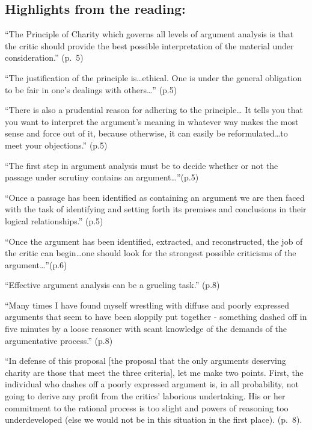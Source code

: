 \documentclass[
]{book}
\begin{document}
\hypertarget{highlights-from-the-reading-3}{%
\subsection{Highlights from the reading:}\label{highlights-from-the-reading-3}}

``The Principle of Charity which governs all levels of argument analysis is that the critic should provide the best possible interpretation of the material under consideration.'' (p.~5)

``The justification of the principle is\ldots ethical. One is under the general obligation to be fair in one's dealings with others\ldots{}'' (p.5)

``There is also a prudential reason for adhering to the principle\ldots{} It tells you that you want to interpret the argument's meaning in whatever way makes the most sense and force out of it, because otherwise, it can easily be reformulated\ldots to meet your objections.'' (p.5)

``The first step in argument analysis must be to decide whether or not the passage under scrutiny contains an argument\ldots{}''(p.5)

``Once a passage has been identified as containing an argument we are then faced with the task of identifying and setting forth its premises and conclusions in their logical relationships.'' (p.5)

``Once the argument has been identified, extracted, and reconstructed, the job of the critic can begin\ldots one should look for the strongest possible criticisms of the argument\ldots{}''(p.6)

``Effective argument analysis can be a grueling task.'' (p.8)

``Many times I have found myself wrestling with diffuse and poorly expressed arguments that seem to have been sloppily put together - something dashed off in five minutes by a loose reasoner with scant knowledge of the demands of the argumentative process.'' (p.8)

``In defense of this proposal {[}the proposal that the only arguments deserving charity are those that meet the three criteria{]}, let me make two points. First, the individual who dashes off a poorly expressed argument is, in all probability, not going to derive any profit from the critics' laborious undertaking. His or her commitment to the rational process is too slight and powers of reasoning too underdeveloped (else we would not be in this situation in the first place). (p.~8).
\end{document}
